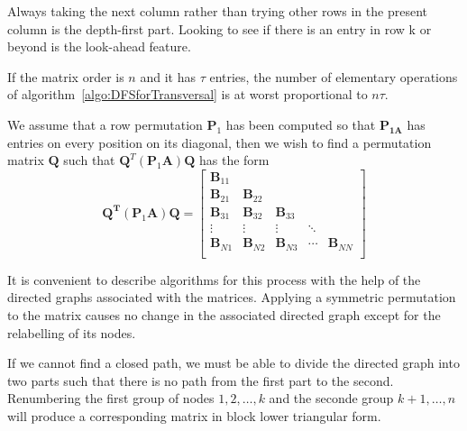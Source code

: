 \begin{rmk}
  Always taking the next column rather than trying other rows in the present
column is the depth-first part. Looking to see if there is an entry in 
row k or  beyond is the look-ahead feature.
\end{rmk}
\begin{thm}
  If the matrix order is $n$ and it has $\tau$ entries, the number of elementary
  operations of algorithm~\ref{algo:DFSforTransversal} is at worst proportional to $n\tau$.
\end{thm}

\begin{rmk}
  We assume that a row permutation $\mathbf{P}_1$ has been computed so that
  $\mathbf{P}_\mathbf{1A}$ has entries on every position on its diagonal, then we wish
  to find a permutation matrix $\mathbf{Q}$ such that $\mathbf{Q}^T(\mathbf{P}_1\mathbf{A})\mathbf{Q}$ has the form
  \begin{equation}
    \mathbf{Q^T}(\mathbf{P}_1\mathbf{A})\mathbf{Q}=\left[
    \begin{array}{ccccc}
      \mathbf{B}_{11}& & & & \\
      \mathbf{B}_{21} & \mathbf{B}_{22} & & & \\
      \mathbf{B}_{31} & \mathbf{B}_{32} & \mathbf{B}_{33} & & \\
      \vdots&\vdots&\vdots&\ddots& \\
      \mathbf{B}_{N1}& \mathbf{B}_{N2}& \mathbf{B}_{N3} & \cdots& \mathbf{B}_{NN}\\
    \end{array}
  \right]
  \end{equation}
\end{rmk}

\begin{rmk}
  It is convenient to describe algorithms for this process with the
  help of the directed graphs associated with the matrices. Applying a
  symmetric permutation to the matrix causes no change in the
  associated directed graph except for the relabelling of its nodes.
\end{rmk}

\begin{thm}
  \label{thm:Divide2Part}
  If we cannot find a closed path, we must be able to divide the
  directed graph into two parts such that there is no path from the
  first part to the second. Renumbering the first group of nodes
  $1,2,\ldots,k$ and the seconde group $k+1,\ldots,n$ will produce a
  corresponding matrix in block lower triangular form.
\end{thm}

